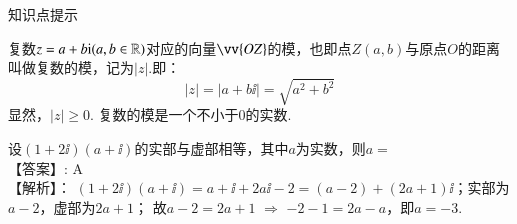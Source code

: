 \begin{exercise}
\begin{framed}{\heiti 知识点提示}
\begin{minipage}[t]{0.65\linewidth}
            复数$z=a+b{\mathrm i}(a,b\in\mathbb{R})$对应的向量$\vv{OZ}$的模，也即点$Z(a,b)$与原点$O$的距离叫做复数的模，记为$|z|$.即：
              \[|z|=|a+b\ii|=\sqrt{a^2+b^2}\]
              显然，$|z|\geqslant0$.
              {\kaishu 复数的模是一个不小于0的实数.}
              \\
          \end{minipage}
          \begin{minipage}[t]{0.35\linewidth}\vspace{-0.5\baselineskip}
            \begin{center}\vspace{-1.5em}
            \end{center}
          \end{minipage}
        \end{framed}
    \item %
      设$(1+2\ii)(a+\ii)$的实部与虚部相等，其中$a$为实数，则$a=$\xz
        \\{\heiti 【答案】:}
            A
        \\{\heiti 【解析】：}
         $(1+2\ii)(a+\ii)=a+\ii+2a\ii-2=(a-2)+(2a+1)\ii$；实部为$a-2$，虚部为$2a+1$；
          故$a-2=2a+1$ $\Rightarrow$ $-2-1=2a-a$，即$a=-3$.

\end{exercise}
